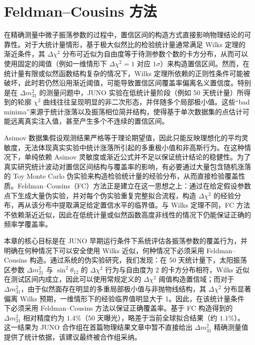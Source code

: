 \chapter{Feldman--Cousins 方法}

在精确测量中微子振荡参数的过程中，置信区间的构造方式直接影响物理结论的可靠性。对于大统计量情形，基于极大似然比的检验统计量通常满足 Wilks 定理的渐近条件，其 $\Delta\chi^2$ 分布可近似为自由度等于待测参数个数的卡方分布，从而可以使用固定的阈值（例如一维情形下 $\Delta\chi^2=1$ 对应 $1\sigma$）来构造置信区间\cite{Wilks:1938dza}。然而，在统计量有限或似然函数结构复杂的情况下，Wilks 定理所依赖的正则性条件可能被破坏，此时若仍然沿用渐近阈值，可能导致置信区间覆盖率偏离名义置信度。特别是在 $\Delta m^2_{31}$ 的测量问题中，JUNO 实验在低统计量阶段（例如 50 天统计量）所得到的轮廓 $\chi^2$ 曲线往往呈现明显的非二次形态，并伴随多个局部极小值。这些“bad minima”来源于统计涨落以及振荡相位简并结构，使得基于单次数据集的点估计可能远离真实注入值，甚至产生多个不连续的置信区间。

Asimov 数据集假设观测结果严格等于理论期望值，因此只能反映理想化的平均灵敏度，无法体现真实实验中统计涨落所引起的多重极小值和非高斯行为。在这种情况下，单纯依赖 Asimov 灵敏度或渐近公式并不足以保证统计结论的稳健性。为了真实研究统计波动对置信区间结构与覆盖率的影响，有必要通过大量包含随机涨落的 Toy Monte Carlo 伪实验来构造检验统计量的经验分布，从而直接检验覆盖性质。Feldman–Cousins（FC）方法\cite{Feldman_1998}正是建立在这一思想之上：通过在给定假设参数点下生成大量伪实验，并对每个伪实验重复完整拟合流程，构造 $\Delta\chi^2$ 的经验分布，再从该分布中提取满足给定置信水平的临界值\cite{Acero2022ProfiledFC}。与 Wilks 定理不同，FC 方法不依赖渐近近似，因此在低统计量或似然函数高度非线性的情况下仍能保证正确的频率学覆盖率。

本章的核心目标是在 JUNO 早期运行条件下系统评估各振荡参数的覆盖行为，并明确在何种情况下可以安全使用 Wilks 近似，何种情况下必须采用 Feldman–Cousins 构造。通过系统的伪实验研究，我们发现：在 50 天统计量下，太阳振荡区参数 $\Delta m^2_{21}$ 与 $\sin^2\theta_{12}$ 的 $\Delta\chi^2$ 行为与自由度为 2 的卡方分布相符，Wilks 近似在测试区间内成立，因此可以使用常规定义的 $\Delta\chi^2$ 阈值构造置信域；而对于 $\Delta m^2_{31}$，由于似然面存在明显的多重局部极小值与非抛物线结构，其 $\Delta\chi^2$ 分布显著偏离 Wilks 预期，一维情形下的经验临界值明显大于 1。因此，在该统计量条件下必须采用 Feldman–Cousins 方法以保证正确覆盖率。基于 FC 构造得到的 $\Delta m^2_{31}$ 相对精度约为 $1.4\%$（50 天曝光），略差于当前全球拟合结果（约 $1.1\%$）。这一结果为 JUNO 合作组在首篇物理结果文章中暂不直接给出 $\Delta m^2_{31}$ 精确测量值提供了统计依据，该建议最终被合作组采纳。

